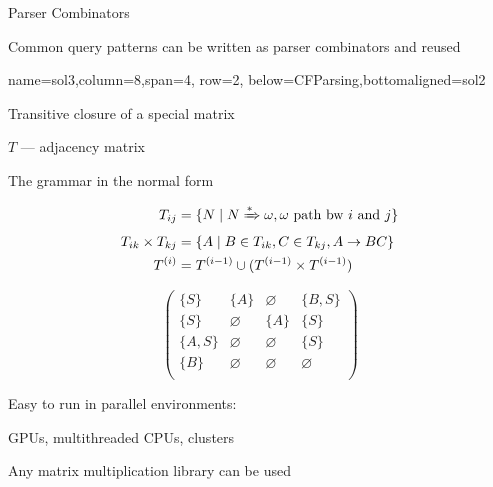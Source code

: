 \documentclass[a0paper,portrait]{baposter}
\begin{document}
\begin{poster}
\begin{posterbox}[name=sol2,column=4,row=4, span=4, below=CFParsing, bottomaligned=sol1]{Parser Combinators}
\begin{center}
Common query patterns can be written as parser combinators and reused
\end{center}
\end{posterbox}

{name=sol3,column=8,span=4, row=2, below=CFParsing,bottomaligned=sol2}
{ 

\begin{center}
Transitive closure of a special matrix

\medskip

$T$ --- adjacency matrix

The grammar in the normal form

\begin{align*} 
T_{ij} &=\{ N \mid N \xRightarrow[]{*} \omega,  \omega \text{ path bw } i \text{ and } j \} \\
T_{ik} \times T_{kj} &= \{ A \mid B \in T_{ik}, C \in T_{kj}, A \rightarrow B C \} \\
T^{(i)} &= T^{(i-1)} \cup (T^{(i-1)} \times T^{(i-1)})
\end{align*}

\medskip

\begin{minipage}[m]{\linewidth}
\[
\begin{pmatrix}
	\{S\}     & \{A\}       & \varnothing & \{B, S\}    \\
	\{S\}       & \varnothing & \{A\}       & \{S\}     \\
	\{A, S\}  & \varnothing & \varnothing & \{S\} \\
	\{B\}       & \varnothing & \varnothing & \varnothing \\
\end{pmatrix}
\]
\end{minipage}

\bigskip

Easy to run in parallel environments: 

GPUs, multithreaded CPUs, clusters

\medskip

Any matrix multiplication library can be used
\end{center}
}



\end{poster}
\end{document}
